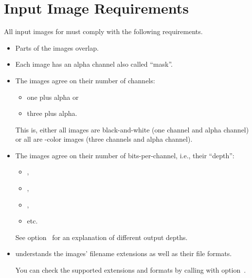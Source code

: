 

\section[Image Requirements]{\label{sec:image-requirements}%
  Input Image Requirements}

All input images for \App{} must comply with the following requirements.

\begin{itemize}
\item
  Parts of the images overlap.

\item
  Each image has an alpha channel also called ``mask''.

\item
  The images agree on their number of channels:

  \begin{itemize}
  \item
    one plus alpha or

  \item
    three plus alpha.
  \end{itemize}


  This is, either all images are black-and-white (one channel and alpha channel) or all are
  -color images (three channels and alpha channel).

\item
  The images agree on their number of bits-per-channel, i.e., their ``depth'':

  \begin{itemize}
  \item
    ,

  \item
    ,

  \item
    ,

  \item
    etc.
  \end{itemize}

  See option~ for an explanation of different output
  depths.

\item
  \App{} understands the images' filename extensions as well as their file formats.

  You can check the supported extensions and formats by calling \App{} with
  option~.
\end{itemize}

